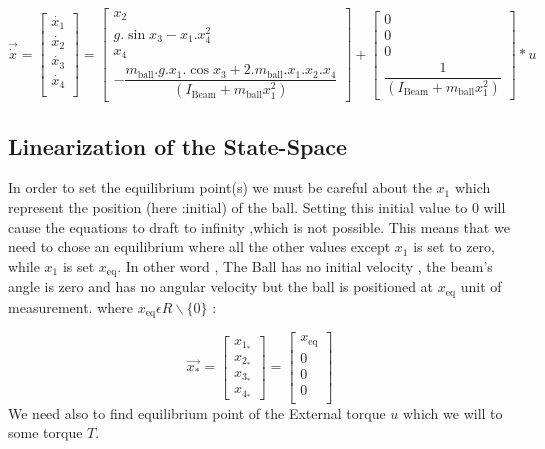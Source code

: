 \begin{equation}
	\vec{\dot{x}} =
	\begin{bmatrix}
		\dot{x_1} \\
		\dot{x_2} \\
		\dot{x_3} \\
		\dot{x_4} \\
	\end{bmatrix} =
	\begin{bmatrix}
		x_2\\
		g.\sin{x_3} - x_1.x_4^2 \\
		x_4\\
		-\dfrac{m_{\text{ball}}.g.x_1.\cos{x_3} + 2.m_{\text{ball}}.x_1.x_2.x_4}{(I_{\text{Beam} } + m_{\text{ball}} x_1^2)}
	\end{bmatrix}+
	\begin{bmatrix}
		0 \\
		0\\
		0\\
		\dfrac{1}{(I_{\text{Beam}} + m_{\text{ball}} x_1^2)}
	\end{bmatrix}*u
\end{equation}
\newpage
\subsection{Linearization of the State-Space}
In order to set the equilibrium point(s) we must be careful about the $x_1$ which represent the position (here :initial) of the ball.
Setting this initial value to 0 will cause the equations to draft to infinity ,which is not possible.
This means that we need to chose an equilibrium where all the other values except $x_1$ is set to zero, while $x_1$ is set $x_{\text{eq}}$.
In other word , The Ball has no initial velocity , the beam's angle is zero and has no angular velocity but the ball is positioned at $x_{\text{eq}}$ unit of measurement.
where $x_{\text{eq}} \epsilon R\backslash\{0\}$ :

\begin{equation}
	\vec{x_*} =
	\begin{bmatrix}
		x_{\text{$1_*$}} \\
		x_{\text{$2_*$}} \\
		x_{\text{$3_*$}} \\
		x_{\text{$4_*$}}
	\end{bmatrix}=
	\begin{bmatrix}
		x_{\text{eq}}\\
		0 \\
		0 \\
		0 \\
	\end{bmatrix}
\end{equation}
We need also to find equilibrium point of the External torque $u$ which we will to some torque $T$.

